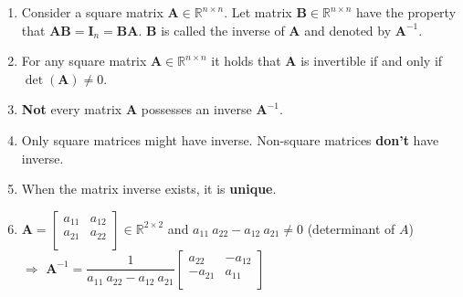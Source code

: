 \begin{enumerate}
    \item Consider a square matrix $\bm{A} \in \mathbb{R}^{n\times n}$. 
    Let matrix $\bm{B} \in \mathbb{R}^{n\times n}$ have the property that $\bm{A}\bm{B} = \bm{I}_n = \bm{B}\bm{A}$. 
    $\bm{B}$ is called the inverse of $\bm{A}$ and denoted by $\bm{A}^{-1}$.
    \hfill \cite{mfml/book/mml/Deisenroth-Faisal-Ong}

    \item 
    \begin{theorem}
        For any square matrix $\bm{A} \in \mathbb{R}^{n\times n}$ it holds that $\bm{A}$ is invertible if and only if $\det(\bm{A})\neq 0$.
        \hfill \cite{mfml/book/mml/Deisenroth-Faisal-Ong}
    \end{theorem}

    \item \textbf{Not} every matrix $\bm{A}$ possesses an inverse $\bm{A}^{-1}$.
    \hfill \cite{mfml/book/mml/Deisenroth-Faisal-Ong}

    \item Only square matrices might have inverse. Non-square matrices \textbf{don't} have inverse.

    \item When the matrix inverse exists, it is \textbf{unique}.
    \hfill \cite{mfml/book/mml/Deisenroth-Faisal-Ong}

    \item $
        \bm{A} = \begin{bmatrix}
            a_{11} & a_{12} \\
            a_{21} & a_{22} \\
        \end{bmatrix} 
        \in \mathbb{R}^{2\times 2}
    $
    \hspace{1cm} and \hspace{1cm}
    $a_{11}\ a_{22} - a_{12}\ a_{21} \neq 0$ (determinant of $A$)\\[0.4cm] 
    $\Rightarrow$
    $
        \bm{A}^{-1} = 
        \dfrac{1}{a_{11}\ a_{22} - a_{12}\ a_{21}}
        \begin{bmatrix}
            a_{22} & -a_{12} \\
            -a_{21} & a_{11} \\
        \end{bmatrix}
    $
    \hfill \cite{mfml/book/mml/Deisenroth-Faisal-Ong}

\end{enumerate}



